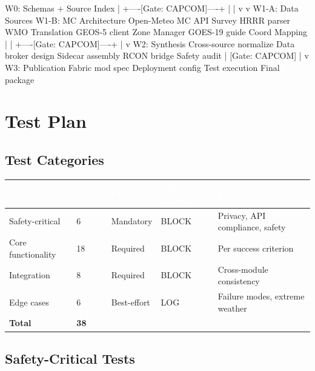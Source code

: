 \documentclass[11pt,letterpaper]{article}
\newcommand{\tableheader}[1]{\textbf{\sffamily\textcolor{white}{#1}}}
\begin{document}
\begin{asciibox}
W0: Schemas + Source Index
    |
    +----[Gate: CAPCOM]----+
    |                      |
    v                      v
W1-A: Data Sources     W1-B: MC Architecture
  Open-Meteo              MC API Survey
  HRRR parser             WMO Translation
  GEOS-5 client           Zone Manager
  GOES-19 guide           Coord Mapping
    |                      |
    +----[Gate: CAPCOM]----+
                |
                v
         W2: Synthesis
         Cross-source normalize
         Data broker design
         Sidecar assembly
         RCON bridge
         Safety audit
                |
         [Gate: CAPCOM]
                |
                v
         W3: Publication
         Fabric mod spec
         Deployment config
         Test execution
         Final package
\end{asciibox}

\section{Test Plan}

\subsection{Test Categories}

\begin{center}
\begin{tabularx}{\textwidth}{L{3cm}C{1.2cm}C{1.5cm}L{2.5cm}X}
\toprule
{}
\tableheader{Category} & \tableheader{Count} & \tableheader{Priority} & \tableheader{Failure Action} & \tableheader{Focus} \\
\midrule
Safety-critical & 6 & Mandatory & BLOCK & Privacy, API compliance, safety \\
Core functionality & 18 & Required & BLOCK & Per success criterion \\
Integration & 8 & Required & BLOCK & Cross-module consistency \\
Edge cases & 6 & Best-effort & LOG & Failure modes, extreme weather \\
\midrule
\textbf{Total} & \textbf{38} & & & \\
\bottomrule
\end{tabularx}
\end{center}

\subsection{Safety-Critical Tests}
\end{document}
